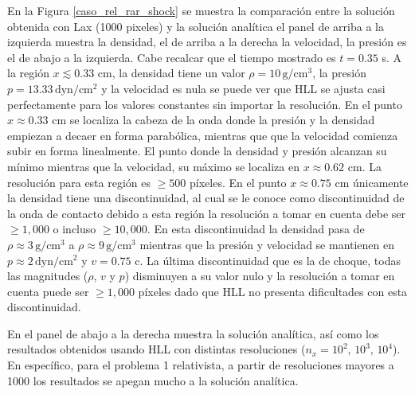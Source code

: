 \documentclass[12pt,a4paper]{book}
\begin{document}
En la Figura \ref{caso_rel_rar_shock} se muestra la comparación entre la solución obtenida con Lax
(1000 pixeles) y la solución analítica
el panel de arriba a la izquierda muestra la densidad, el de 
arriba a la derecha la velocidad, la presión es el de abajo a la izquierda. Cabe recalcar que  el 
tiempo mostrado es  $t = 0.35$ s.
A la región $x \lesssim 0.33$ cm, la densidad tiene un valor $\rho = 10 \,  \text{g}/ \text{cm}^3$, 
la presión $p = 13.33 \,  \text{dyn}/ \text{cm}^2 $
y la velocidad es nula se puede ver que HLL se ajusta casi perfectamente para los valores constantes
sin importar la resolución. 
En el punto $x \approx 0.33$ cm se localiza la cabeza de la onda donde la presión y la densidad 
empiezan a decaer en forma parabólica, mientras que que la velocidad comienza subir en forma linealmente.
El punto donde la densidad y presión alcanzan su mínimo mientras que la velocidad, su máximo
se localiza en $x \approx 0.62$ cm. La resolución para esta región es $\geq 500$ 
píxeles. En el punto $x \approx 0.75$ cm únicamente 
la densidad tiene una discontinuidad, al cual se le conoce como discontinuidad de la onda de contacto
debido a esta región la resolución a tomar en cuenta debe ser $\geq 1,000$ o incluso $\geq 10,000$.
En esta discontinuidad la densidad pasa de $ \rho \approx 3 \,  \text{g}/ \text{cm}^3$ a
$ \rho \approx 9 \,  \text{g}/ \text{cm}^3$ mientras que la presión 
y velocidad se mantienen en $p \approx 2\,  \text{dyn}/ \text{cm}^2 $ 
y $v = 0.75$ c. La última discontinuidad que es la de choque,
todas las magnitudes ($\rho$, $v$ y $p$) disminuyen a su valor nulo y la resolución a tomar en cuenta
puede ser $\geq 1,000$ píxeles dado que HLL no presenta dificultades con esta discontinuidad.

En el panel de abajo a la derecha muestra la solución analítica, así como los resultados obtenidos 
usando HLL con distintas resoluciones ($n_x = 10^2, \, 10^3, \,10^4$).  
En específico, para el problema 1 relativista, a partir de resoluciones mayores a 1000 los
resultados se apegan mucho a la solución analítica.
\end{document}
